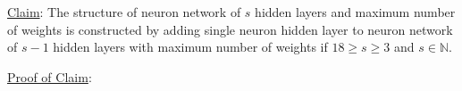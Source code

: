 \documentclass[12pt]{article}
\newcommand{\ParTh}[1]{\left(#1\right)}
\begin{document}
\begin{enumerate}

\end{enumerate}
\underline{Claim}: The structure of neuron network of $s$ hidden layers and maximum number of weights is constructed by adding single neuron hidden layer to neuron network of $s-1$ hidden layers with maximum number of weights if $18\geq s\geq3$ and $s\in\mathbb{N}$.

\underline{Proof of Claim}:
\end{document}
